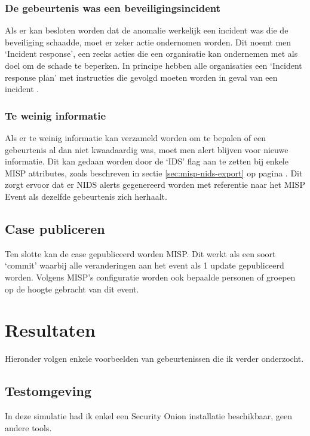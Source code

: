 \documentclass[a4paper,12pt]{report}
\begin{document}
\subsubsection{De gebeurtenis was een beveiligingsincident}
Als er kan besloten worden dat de anomalie werkelijk een incident was die de beveiliging schaadde, moet er zeker actie ondernomen worden.
Dit noemt men `Incident response', een reeks acties die een organisatie kan ondernemen met als doel om de schade te beperken.
In principe hebben alle organisaties een `Incident response plan' met instructies die gevolgd moeten worden in geval van een incident \autocite{digitalguardian:incident-response}.

\subsubsection{Te weinig informatie}
Als er te weinig informatie kan verzameld worden om te bepalen of een gebeurtenis al dan niet kwaadaardig was, moet men alert blijven voor nieuwe informatie.
Dit kan gedaan worden door de `IDS' flag aan te zetten bij enkele MISP attributes, zoals beschreven in sectie \ref{sec:misp-nids-export} op pagina \pageref{sec:misp-nids-export}.
Dit zorgt ervoor dat er NIDS alerts gegenereerd worden met referentie naar het MISP Event als dezelfde gebeurtenis zich herhaalt.

\subsection{Case publiceren}
Ten slotte kan de case gepubliceerd worden MISP.
Dit werkt als een soort `commit' waarbij alle veranderingen aan het event als 1 update gepubliceerd worden.
Volgens MISP's configuratie worden ook bepaalde personen of groepen op de hoogte gebracht van dit event.

\section{Resultaten}
Hieronder volgen enkele voorbeelden van gebeurtenissen die ik verder onderzocht.
\subsection{Testomgeving}
In deze simulatie had ik enkel een Security Onion installatie beschikbaar, geen andere tools.
\end{document}
